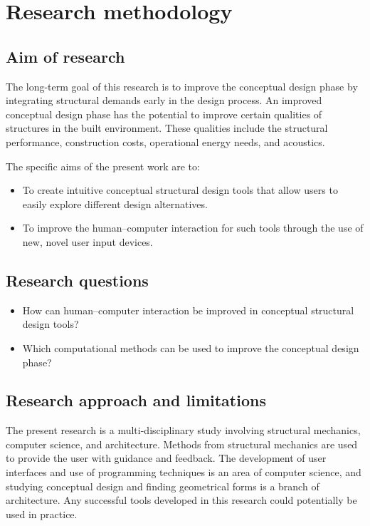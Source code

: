 \section{Research methodology }
\subsection{Aim of research}
The long-term goal of this research is to improve the conceptual design phase by integrating structural demands early in the design process. An improved conceptual design phase has the potential to improve certain qualities of structures in the built environment. These qualities include the structural performance, construction costs, operational energy needs, and acoustics.

The specific aims of the present work are to:
\begin{itemize}  
\item  To create intuitive conceptual structural design tools that allow users to easily explore different design alternatives.
\item To improve the human--computer interaction for such tools through the use of new, novel user input devices. 
\end{itemize}


\subsection{Research questions}
\begin{itemize}  
\item How can human--computer interaction be improved in conceptual structural design tools?
\item  Which computational methods can be used to improve the conceptual design phase? 
\end{itemize}

\subsection{Research approach and limitations}
The present research is a multi-disciplinary study involving structural mechanics, computer science, and architecture. Methods from structural mechanics are used to provide the user with guidance and feedback. The development of user interfaces and use of programming techniques is an area of computer science, and studying conceptual design and finding geometrical forms is a branch of architecture. Any successful tools developed in this research could potentially be used in practice.

